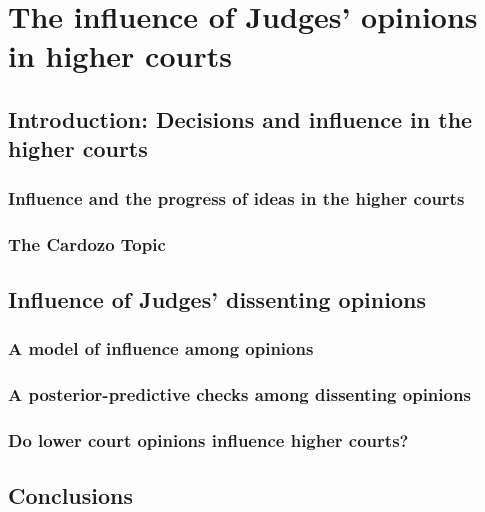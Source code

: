 \chapter{The influence of Judges' opinions in higher courts}

\section{Introduction: Decisions and influence in the higher courts}

\subsection{Influence and the progress of ideas in the higher courts}

\subsection{The Cardozo Topic}

\section{Influence of Judges' dissenting opinions}

\subsection{A model of influence among opinions}

\subsection{A posterior-predictive checks among dissenting opinions}

\subsection{Do lower court opinions influence higher courts?}

\section*{Conclusions}

